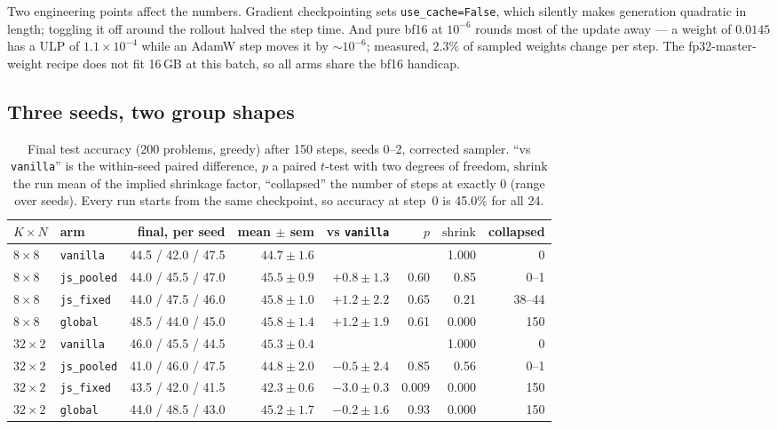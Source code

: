 \documentclass{article}
\newcommand{\shrink}{\mathrm{shrink}}
\newcommand{\arm}[1]{\texttt{#1}}
\begin{document}
Two engineering points affect the numbers. Gradient checkpointing sets
\texttt{use\_cache=False}, which silently makes generation quadratic in
length; toggling it off around the rollout halved the step time. And pure
bf16 at $10^{-6}$ rounds most of the update away --- a weight of $0.0145$
has a ULP of $1.1\times10^{-4}$ while an AdamW step moves it by
${\sim}10^{-6}$; measured, $2.3\%$ of sampled weights change per step. The
fp32-master-weight recipe does not fit 16\,GB at this batch, so all arms
share the bf16 handicap.

\subsection{Three seeds, two group shapes}
\label{sec:training}

\begin{table}[t]\centering\small\setlength{\tabcolsep}{4pt}
\begin{tabular}{llrrrrrr}
\toprule
$K{\times}N$ & arm & final, per seed & mean $\pm$ sem & vs \arm{vanilla} & $p$ & $\shrink$ & collapsed \\
\midrule
$8{\times}8$  & \arm{vanilla}    & 44.5 / 42.0 / 47.5 & $44.7\pm1.6$ & & & 1.000 & 0 \\
$8{\times}8$  & \arm{js\_pooled} & 44.0 / 45.5 / 47.0 & $45.5\pm0.9$ & $+0.8\pm1.3$ & 0.60 & 0.85 & 0--1 \\
$8{\times}8$  & \arm{js\_fixed}  & 44.0 / 47.5 / 46.0 & $45.8\pm1.0$ & $+1.2\pm2.2$ & 0.65 & 0.21 & 38--44 \\
$8{\times}8$  & \arm{global}     & 48.5 / 44.0 / 45.0 & $45.8\pm1.4$ & $+1.2\pm1.9$ & 0.61 & 0.000 & 150 \\
\midrule
$32{\times}2$ & \arm{vanilla}    & 46.0 / 45.5 / 44.5 & $45.3\pm0.4$ & & & 1.000 & 0 \\
$32{\times}2$ & \arm{js\_pooled} & 41.0 / 46.0 / 47.5 & $44.8\pm2.0$ & $-0.5\pm2.4$ & 0.85 & 0.56 & 0--1 \\
$32{\times}2$ & \arm{js\_fixed}  & 43.5 / 42.0 / 41.5 & $42.3\pm0.6$ & $-3.0\pm0.3$ & 0.009 & 0.000 & 150 \\
$32{\times}2$ & \arm{global}     & 44.0 / 48.5 / 43.0 & $45.2\pm1.7$ & $-0.2\pm1.6$ & 0.93 & 0.000 & 150 \\
\bottomrule
\end{tabular}
\caption{Final test accuracy (200 problems, greedy) after 150 steps, seeds
0--2, corrected sampler. ``vs \arm{vanilla}'' is the within-seed paired
difference, $p$ a paired $t$-test with two degrees of freedom, $\shrink$
the run mean of the implied shrinkage factor, ``collapsed'' the number of
steps at exactly $0$ (range over seeds). Every run starts from the same
checkpoint, so accuracy at step~0 is 45.0\% for all 24.}
\label{tab:phase4b}
\end{table}
\end{document}
